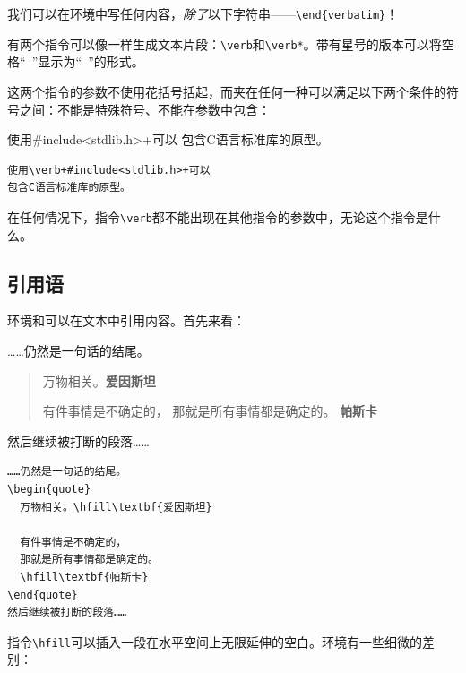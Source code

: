 \begin{exclamation}
我们可以在环境中写任何内容，\emph{除了}以下字符串——\verb|\end{verbatim}|！
\end{exclamation}

有两个指令可以像一样生成文本片段：\verb|\verb|和\verb|\verb*|。带有星号的版本可以将空格“\verb| |”显示为“\verb*| |”的形式。

这两个指令的参数不使用花括号括起，而夹在任何一种可以满足以下两个条件的符号之间：不能是特殊符号、不能在参数中包含：

\begin{codelist}[2.14]{
  使用{\ttfamily \#include<stdlib.h>+}可以
  包含C语言标准库的原型。
}\begin{verbatim}
使用\verb+#include<stdlib.h>+可以
包含C语言标准库的原型。
\end{verbatim}
\end{codelist}

\begin{exclamation}
在任何情况下，指令\verb|\verb|都不能出现在其他指令的参数中，无论这个指令是什么。
\end{exclamation}

\subsection{引用语}

环境和可以在文本中引用内容。首先来看：

\begin{codelist}[2.15]{
  ……仍然是一句话的结尾。
\begin{quote}
  万物相关。\hfill\textbf{爱因斯坦}

  有件事情是不确定的，
  那就是所有事情都是确定的。
  \hfill\textbf{帕斯卡}
\end{quote}
然后继续被打断的段落……
}\begin{verbatim}
……仍然是一句话的结尾。
\begin{quote}
  万物相关。\hfill\textbf{爱因斯坦}

  有件事情是不确定的，
  那就是所有事情都是确定的。
  \hfill\textbf{帕斯卡}
\end{quote}
然后继续被打断的段落……
\end{verbatim}
\end{codelist}

指令\verb|\hfill|可以插入一段在水平空间上无限延伸的空白。环境有一些细微的差别：

